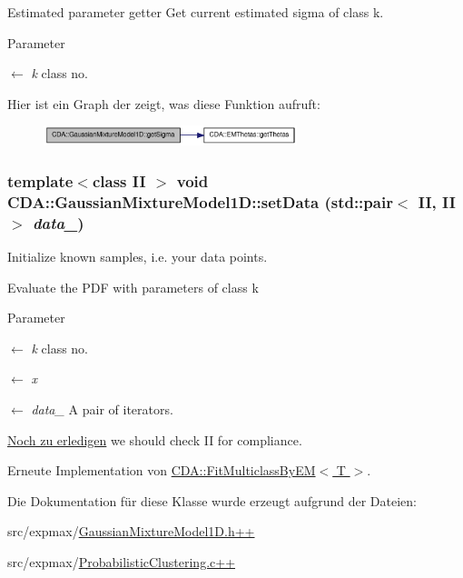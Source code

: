 Estimated parameter getter Get current estimated sigma of class k. 


\begin{DoxyParams}{Parameter}
\item[\mbox{$\leftarrow$} {\em k}]class no. \end{DoxyParams}


Hier ist ein Graph der zeigt, was diese Funktion aufruft:\nopagebreak
\begin{figure}[H]
\begin{center}
\leavevmode
\includegraphics[width=209pt]{classCDA_1_1GaussianMixtureModel1D_aa943f4410a27db1d9530b7c63e45b90b_cgraph}
\end{center}
\end{figure}


\hypertarget{classCDA_1_1GaussianMixtureModel1D_ada5a646f31d12697bc0fc66934a54dab}{
\subsubsection[{setData}]{\setlength{\rightskip}{0pt plus 5cm}template$<$class II $>$ void CDA::GaussianMixtureModel1D::setData (std::pair$<$ II, II $>$ {\em data\_\-})}}
\label{classCDA_1_1GaussianMixtureModel1D_ada5a646f31d12697bc0fc66934a54dab}


Initialize known samples, i.e. your data points. 

Evaluate the PDF with parameters of class k


\begin{DoxyParams}{Parameter}
\item[\mbox{$\leftarrow$} {\em k}]class no. \item[\mbox{$\leftarrow$} {\em x}]\item[\mbox{$\leftarrow$} {\em data\_\-}]A pair of iterators. \end{DoxyParams}
\begin{Desc}
\item[\hyperlink{todo__todo000003}{Noch zu erledigen}]we should check II for compliance. \end{Desc}


Erneute Implementation von \hyperlink{classCDA_1_1FitMulticlassByEM_a7381428ebb707dbdd0553d6bc0e7113b}{CDA::FitMulticlassByEM$<$ T $>$}.



Die Dokumentation für diese Klasse wurde erzeugt aufgrund der Dateien:\begin{DoxyCompactItemize}
\item 
src/expmax/\hyperlink{GaussianMixtureModel1D_8h_09_09}{GaussianMixtureModel1D.h++}\item 
src/expmax/\hyperlink{ProbabilisticClustering_8c_09_09}{ProbabilisticClustering.c++}\end{DoxyCompactItemize}
